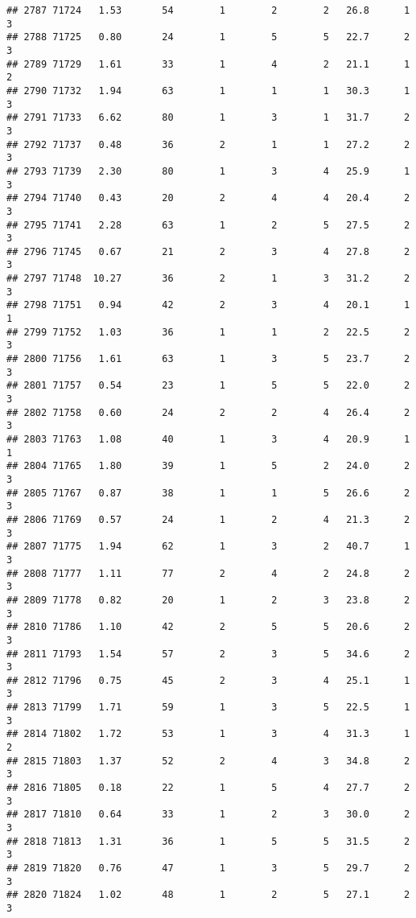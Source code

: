 \documentclass[
]{article}
\begin{document}
\begin{verbatim}
## 2787 71724   1.53       54        1        2        2   26.8      1      3
## 2788 71725   0.80       24        1        5        5   22.7      2      3
## 2789 71729   1.61       33        1        4        2   21.1      1      2
## 2790 71732   1.94       63        1        1        1   30.3      1      3
## 2791 71733   6.62       80        1        3        1   31.7      2      3
## 2792 71737   0.48       36        2        1        1   27.2      2      3
## 2793 71739   2.30       80        1        3        4   25.9      1      3
## 2794 71740   0.43       20        2        4        4   20.4      2      3
## 2795 71741   2.28       63        1        2        5   27.5      2      3
## 2796 71745   0.67       21        2        3        4   27.8      2      3
## 2797 71748  10.27       36        2        1        3   31.2      2      3
## 2798 71751   0.94       42        2        3        4   20.1      1      1
## 2799 71752   1.03       36        1        1        2   22.5      2      3
## 2800 71756   1.61       63        1        3        5   23.7      2      3
## 2801 71757   0.54       23        1        5        5   22.0      2      3
## 2802 71758   0.60       24        2        2        4   26.4      2      3
## 2803 71763   1.08       40        1        3        4   20.9      1      1
## 2804 71765   1.80       39        1        5        2   24.0      2      3
## 2805 71767   0.87       38        1        1        5   26.6      2      3
## 2806 71769   0.57       24        1        2        4   21.3      2      3
## 2807 71775   1.94       62        1        3        2   40.7      1      3
## 2808 71777   1.11       77        2        4        2   24.8      2      3
## 2809 71778   0.82       20        1        2        3   23.8      2      3
## 2810 71786   1.10       42        2        5        5   20.6      2      3
## 2811 71793   1.54       57        2        3        5   34.6      2      3
## 2812 71796   0.75       45        2        3        4   25.1      1      3
## 2813 71799   1.71       59        1        3        5   22.5      1      3
## 2814 71802   1.72       53        1        3        4   31.3      1      2
## 2815 71803   1.37       52        2        4        3   34.8      2      3
## 2816 71805   0.18       22        1        5        4   27.7      2      3
## 2817 71810   0.64       33        1        2        3   30.0      2      3
## 2818 71813   1.31       36        1        5        5   31.5      2      3
## 2819 71820   0.76       47        1        3        5   29.7      2      3
## 2820 71824   1.02       48        1        2        5   27.1      2      3

\end{verbatim}
\end{document}
